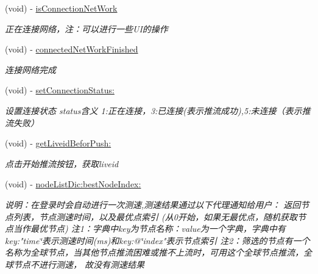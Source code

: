 \begin{DoxyCompactItemize}
(void) -\/ \hyperlink{protocol_c_c_push_util_delegate_01-p_a90d9ba4687cbdbca67be786ebbecda25}{is\+Connection\+Net\+Work}
\begin{DoxyCompactList}\small\item\em 正在连接网络，注：可以进行一些\+U\+I的操作 \end{DoxyCompactList}\item 
\mbox{\label{protocol_c_c_push_util_delegate_01-p_aa8a35146fddf6ac746301d833c378a14}} 
(void) -\/ \hyperlink{protocol_c_c_push_util_delegate_01-p_aa8a35146fddf6ac746301d833c378a14}{connected\+Net\+Work\+Finished}
\begin{DoxyCompactList}\small\item\em 连接网络完成 \end{DoxyCompactList}\item 
\mbox{\label{protocol_c_c_push_util_delegate_01-p_a8a375a1f842047cb5bc1ec497bd76992}} 
(void) -\/ \hyperlink{protocol_c_c_push_util_delegate_01-p_a8a375a1f842047cb5bc1ec497bd76992}{set\+Connection\+Status\+:}
\begin{DoxyCompactList}\small\item\em 设置连接状态 status含义 1\+:正在连接，3\+:已连接(表示推流成功),5\+:未连接（表示推流失败） \end{DoxyCompactList}\item 
\mbox{\label{protocol_c_c_push_util_delegate_01-p_a4f912a0a5ef8a60d5a10f10792b83a91}} 
(void) -\/ \hyperlink{protocol_c_c_push_util_delegate_01-p_a4f912a0a5ef8a60d5a10f10792b83a91}{get\+Liveid\+Befor\+Push\+:}
\begin{DoxyCompactList}\small\item\em 点击开始推流按钮，获取liveid \end{DoxyCompactList}\item 
\mbox{\label{protocol_c_c_push_util_delegate_01-p_a21bdf78f6576a1c1160a3a84c3ddb414}} 
(void) -\/ \hyperlink{protocol_c_c_push_util_delegate_01-p_a21bdf78f6576a1c1160a3a84c3ddb414}{node\+List\+Dic\+:best\+Node\+Index\+:}
\begin{DoxyCompactList}\small\item\em 说明：在登录时会自动进行一次测速,测速结果通过以下代理通知给用户： 返回节点列表，节点测速时间，以及最优点索引 (从0开始，如果无最优点，随机获取节点当作最优节点) 注1：字典中key为节点名称：value为一个字典，字典中有key\+:"time\char`\"{}表示测速时间(ms)和key\+:@\char`\"{}index"表示节点索引 注2：筛选的节点有一个名称为全球节点，当其他节点推流困难或推不上流时，可用这个全球节点推流，全球节点不进行测速， 故没有测速结果 \end{DoxyCompactList}\item 

\end{DoxyCompactItemize}
